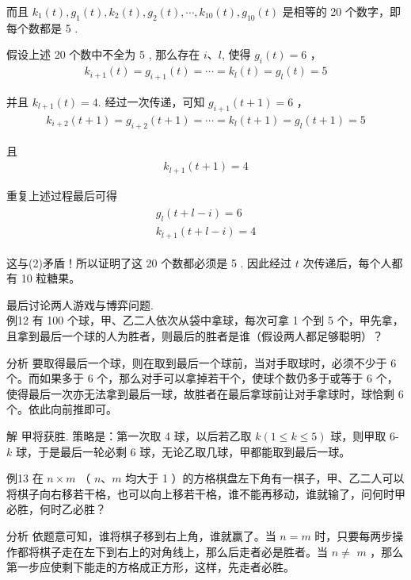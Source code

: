 \documentclass[10pt]{article}
\begin{document}
而且 $k_{1}(t), g_{1}(t), k_{2}(t), g_{2}(t), \cdots, k_{10}(t), g_{10}(t)$ 是相等的 20 个数字，即每个数都是 5 .

假设上述 20 个数中不全为 5 , 那么存在 $i 、 l$, 使得 $g_{i}(t)=6$ ，\\
\begin{align*}
k_{i+1}(t)=g_{i+1}(t)=\cdots=k_{l}(t)=g_{l}(t)=5
\end{align*}

并且 $k_{l+1}(t)=4$. 经过一次传递，可知 $g_{i+1}(t+1)=6$ ，\\
\begin{align*}
k_{i+2}(t+1)=g_{i+2}(t+1)=\cdots=k_{l}(t+1)=g_{l}(t+1)=5
\end{align*}

且\\
\begin{align*}
k_{l+1}(t+1)=4
\end{align*}

重复上述过程最后可得\\
\begin{align*}
\begin{gathered}
g_{l}(t+l-i)=6 \\
k_{l+1}(t+l-i)=4
\end{gathered}
\end{align*}

这与(2)矛盾！所以证明了这 20 个数都必须是 5 . 因此经过 $t$ 次传递后，每个人都有 10 粒糖果。

最后讨论两人游戏与博弈问题.\\
例12 有 100 个球，甲、乙二人依次从袋中拿球，每次可拿 1 个到 5 个，甲先拿，且拿到最后一个球的人为胜者，则最后的胜者是谁（假设两人都足够聪明）？

分析 要取得最后一个球，则在取到最后一个球前，当对手取球时，必须不少于 6 个。而如果多于 6 个，那么对手可以拿掉若干个，使球个数仍多于或等于 6 个，使得最后一次亦无法拿到最后一球，故胜者在最后拿球前让对手拿球时，球恰剩 6 个。依此向前推即可。

解 甲将获胜. 策略是：第一次取 4 球，以后若乙取 $k(1 \leqslant k \leqslant 5)$ 球，则甲取 6- $k$ 球，于是最后一轮必剩 6 球，无论乙取几球，甲都能取到最后一球。

例13 在 $n \times m$ （ $n 、 m$ 均大于 1 ）的方格棋盘左下角有一棋子，甲、乙二人可以将棋子向右移若干格，也可以向上移若干格，谁不能再移动，谁就输了，问何时甲必胜，何时乙必胜？

分析 依题意可知，谁将棋子移到右上角，谁就赢了。当 $n=m$ 时，只要每两步操作都将棋子走在左下到右上的对角线上，那么后走者必是胜者。当 $n \neq$ $m$ ，那么第一步应使剩下能走的方格成正方形，这样，先走者必胜。
\end{document}
